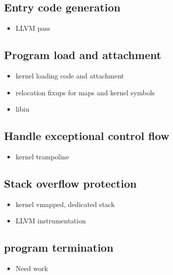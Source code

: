 \subsection{Entry code generation}
\begin{itemize}
    \item LLVM pass
\end{itemize}

\subsection{Program load and attachment}
\begin{itemize}
    \item kernel loading code and attachment
    \item relocation fixups for maps and kernel symbols
    \item libiu
\end{itemize}

\subsection{Handle exceptional control flow}
\begin{itemize}
    \item kernel trampoline
\end{itemize}

\subsection{Stack overflow protection}
\begin{itemize}
    \item kernel vmapped, dedicated stack
    \item LLVM instrumentation
\end{itemize}

\subsection{program termination}
\begin{itemize}
    \item Need work
\end{itemize}
